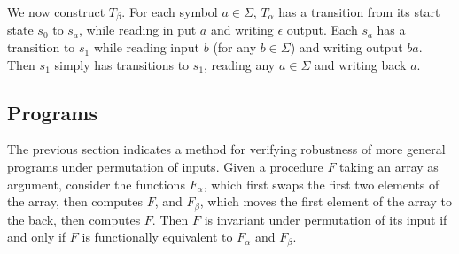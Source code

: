 \documentclass{llncs}
\begin{document}
    We now construct $T_\beta$.
    For each symbol $a \in \Sigma$,
    $T_\alpha$ has a transition from its start
    state $s_0$ to $s_a$, while reading in put $a$ and
    writing $\epsilon$ output.
    Each $s_a$ has a transition to $s_1$ while
    reading input $b$ (for any $b\in \Sigma$)
    and writing output $ba$.
    Then $s_1$ simply has transitions to $s_1$,
    reading any $a\in \Sigma$ and writing
    back $a$.


  \subsection{Programs}
    The previous section indicates a method for verifying
    robustness of more general programs under permutation of inputs.
    Given a procedure $F$ taking an array as argument, consider the functions
    $F_\alpha$, which first swaps the first two elements of the array, then computes
    $F$, and $F_\beta$, which moves the first element of the array to the back, then
    computes $F$. Then $F$ is invariant under permutation of its input if and only
    if $F$ is functionally equivalent to $F_\alpha$ and $F_\beta$.

\end{document}
